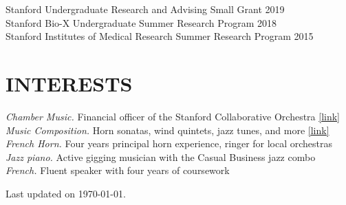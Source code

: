 \documentclass[margin, 10pt]{res}
\begin{document}
\begin{resume}
Stanford Undergraduate Research and Advising Small Grant \hfill 2019 \\
Stanford Bio-X Undergraduate Summer Research Program \hfill 2018 \\
Stanford Institutes of Medical Research Summer Research Program \hfill 2015

\section{INTERESTS}

\textit{Chamber Music.} Financial officer of the Stanford Collaborative Orchestra \href{https://scor.stanford.edu}{[link]} \\
\textit{Music Composition.} Horn sonatas, wind quintets, jazz tunes, and more \href{https://stanford.edu/~jeffjar/music.html}{[link]} \\
\textit{French Horn.} Four years principal horn experience, ringer for local orchestras \\
\textit{Jazz piano.} Active gigging musician with the Casual Business jazz combo \\
\textit{French.} Fluent speaker with four years of coursework

\end{resume}

\vfill\hfill{\scriptsize Last updated on \today.}
\end{document}
